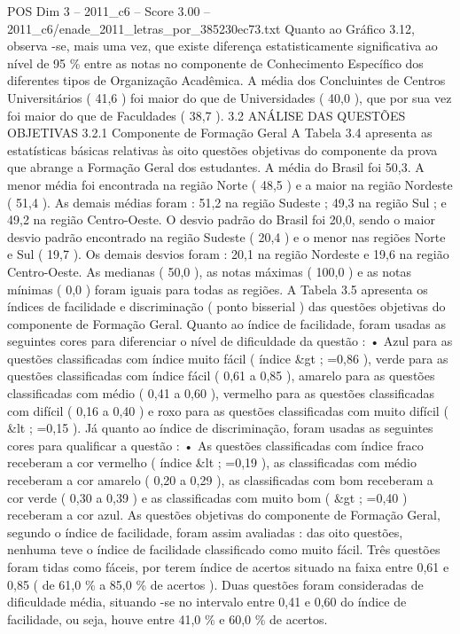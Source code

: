 \begin{textsample}{POS Dim 3 – 2011\_c6 – Score 3.00 – 2011\_c6/enade\_2011\_letras\_por\_385230ec73.txt}
Quanto ao Gráfico 3.12, observa -se, mais uma vez, que existe diferença estatisticamente significativa ao nível de 95 \% entre as notas no componente de Conhecimento Específico dos diferentes tipos de Organização Acadêmica.
A média dos Concluintes de Centros Universitários ( 41,6 ) foi maior do que de Universidades ( 40,0 ), que por sua vez foi maior do que de Faculdades ( 38,7 ). 3.2 ANÁLISE DAS QUESTÕES OBJETIVAS 3.2.1 Componente de Formação Geral A Tabela 3.4 apresenta as estatísticas básicas relativas às oito questões objetivas do componente da prova que abrange a Formação Geral dos estudantes.
A média do Brasil foi 50,3.
A menor média foi encontrada na região Norte ( 48,5 ) e a maior na região Nordeste ( 51,4 ).
As demais médias foram : 51,2 na região Sudeste ; 49,3 na região Sul ; e 49,2 na região Centro-Oeste.
O desvio padrão do Brasil foi 20,0, sendo o maior desvio padrão encontrado na região Sudeste ( 20,4 ) e o menor nas regiões Norte e Sul ( 19,7 ).
Os demais desvios foram : 20,1 na região Nordeste e 19,6 na região Centro-Oeste.
As medianas ( 50,0 ), as notas máximas ( 100,0 ) e as notas mínimas ( 0,0 ) foram iguais para todas as regiões.
A Tabela 3.5 apresenta os índices de facilidade e discriminação ( ponto bisserial ) das questões objetivas do componente de Formação Geral.
Quanto ao índice de facilidade, foram usadas as seguintes cores para diferenciar o nível de dificuldade da questão : • Azul para as questões classificadas com índice muito fácil ( índice \&gt ; =0,86 ), verde para as questões classificadas com índice fácil ( 0,61 a 0,85 ), amarelo para as questões classificadas com médio ( 0,41 a 0,60 ), vermelho para as questões classificadas com difícil ( 0,16 a 0,40 ) e roxo para as questões classificadas com muito difícil ( \&lt ; =0,15 ).
Já quanto ao índice de discriminação, foram usadas as seguintes cores para qualificar a questão : • As questões classificadas com índice fraco receberam a cor vermelho ( índice \&lt ; =0,19 ), as classificadas com médio receberam a cor amarelo ( 0,20 a 0,29 ), as classificadas com bom receberam a cor verde ( 0,30 a 0,39 ) e as classificadas com muito bom ( \&gt ; =0,40 ) receberam a cor azul.
As questões objetivas do componente de Formação Geral, segundo o índice de facilidade, foram assim avaliadas : das oito questões, nenhuma teve o índice de facilidade classificado como muito fácil.
Três questões foram tidas como fáceis, por terem índice de acertos situado na faixa entre 0,61 e 0,85 ( de 61,0 \% a 85,0 \% de acertos ).
Duas questões foram consideradas de dificuldade média, situando -se no intervalo entre 0,41 e 0,60 do índice de facilidade, ou seja, houve entre 41,0 \% e 60,0 \% de acertos.

\end{textsample}
